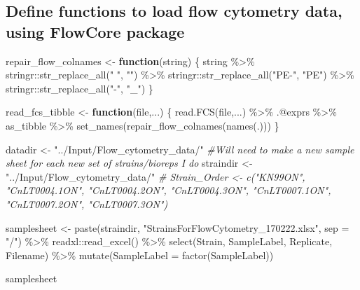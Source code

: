 \documentclass[
]{article}
\newenvironment{Shaded}{\begin{snugshade}}{\end{snugshade}}
\newcommand{\AttributeTok}[1]{\textcolor[rgb]{0.77,0.63,0.00}{#1}}
\newcommand{\CommentTok}[1]{\textcolor[rgb]{0.56,0.35,0.01}{\textit{#1}}}
\newcommand{\ControlFlowTok}[1]{\textcolor[rgb]{0.13,0.29,0.53}{\textbf{#1}}}
\newcommand{\FunctionTok}[1]{\textcolor[rgb]{0.00,0.00,0.00}{#1}}
\newcommand{\NormalTok}[1]{#1}
\newcommand{\OtherTok}[1]{\textcolor[rgb]{0.56,0.35,0.01}{#1}}
\newcommand{\SpecialCharTok}[1]{\textcolor[rgb]{0.00,0.00,0.00}{#1}}
\newcommand{\StringTok}[1]{\textcolor[rgb]{0.31,0.60,0.02}{#1}}
\begin{document}
\hypertarget{define-functions-to-load-flow-cytometry-data-using-flowcore-package}{%
\subsection{Define functions to load flow cytometry data, using FlowCore
package}\label{define-functions-to-load-flow-cytometry-data-using-flowcore-package}}

\begin{Shaded}
\begin{Highlighting}[]
\NormalTok{repair\_flow\_colnames }\OtherTok{\textless{}{-}} \ControlFlowTok{function}\NormalTok{(string) \{}
\NormalTok{  string }\SpecialCharTok{\%\textgreater{}\%}
\NormalTok{    stringr}\SpecialCharTok{::}\FunctionTok{str\_replace\_all}\NormalTok{(}\StringTok{" "}\NormalTok{, }\StringTok{""}\NormalTok{) }\SpecialCharTok{\%\textgreater{}\%}
\NormalTok{    stringr}\SpecialCharTok{::}\FunctionTok{str\_replace\_all}\NormalTok{(}\StringTok{"PE{-}"}\NormalTok{, }\StringTok{"PE"}\NormalTok{) }\SpecialCharTok{\%\textgreater{}\%}
\NormalTok{    stringr}\SpecialCharTok{::}\FunctionTok{str\_replace\_all}\NormalTok{(}\StringTok{"{-}"}\NormalTok{, }\StringTok{"\_"}\NormalTok{)}
\NormalTok{\}}

\NormalTok{read\_fcs\_tibble }\OtherTok{\textless{}{-}} \ControlFlowTok{function}\NormalTok{(file,...) \{}
  \FunctionTok{read.FCS}\NormalTok{(file,...) }\SpecialCharTok{\%\textgreater{}\%}
\NormalTok{    .}\SpecialCharTok{@}\NormalTok{exprs }\SpecialCharTok{\%\textgreater{}\%}
\NormalTok{    as\_tibble }\SpecialCharTok{\%\textgreater{}\%}
    \FunctionTok{set\_names}\NormalTok{(}\FunctionTok{repair\_flow\_colnames}\NormalTok{(}\FunctionTok{names}\NormalTok{(.)))}
\NormalTok{\}}
\end{Highlighting}
\end{Shaded}

\begin{Shaded}
\begin{Highlighting}[]
\NormalTok{datadir }\OtherTok{\textless{}{-}} \StringTok{"../Input/Flow\_cytometry\_data/"}
\CommentTok{\#Will need to make a new sample sheet for each new set of strains/bioreps I do}
\NormalTok{straindir }\OtherTok{\textless{}{-}} \StringTok{"../Input/Flow\_cytometry\_data/"}
\CommentTok{\# Strain\_Order \textless{}{-}  c("KN99ON", "CnLT0004.1ON", "CnLT0004.2ON", "CnLT0004.3ON", "CnLT0007.1ON", "CnLT0007.2ON", "CnLT0007.3ON")}

\NormalTok{samplesheet }\OtherTok{\textless{}{-}} \FunctionTok{paste}\NormalTok{(straindir, }\StringTok{"StrainsForFlowCytometry\_170222.xlsx"}\NormalTok{, }\AttributeTok{sep =} \StringTok{"/"}\NormalTok{) }\SpecialCharTok{\%\textgreater{}\%}
\NormalTok{  readxl}\SpecialCharTok{::}\FunctionTok{read\_excel}\NormalTok{() }\SpecialCharTok{\%\textgreater{}\%}
  \FunctionTok{select}\NormalTok{(Strain, SampleLabel, Replicate, Filename) }\SpecialCharTok{\%\textgreater{}\%}
  \FunctionTok{mutate}\NormalTok{(}\AttributeTok{SampleLabel =} \FunctionTok{factor}\NormalTok{(SampleLabel))}

\NormalTok{samplesheet}
\end{Highlighting}
\end{Shaded}
\end{document}
